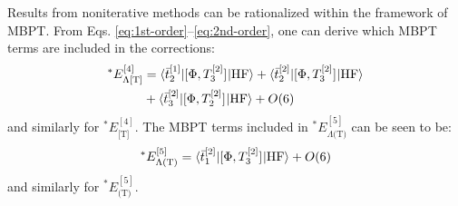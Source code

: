 Results from noniterative methods can be rationalized within the
framework of \acrshort*{MBPT}.\autocite{Stanton1997-lx, Koch1997-nm,
Eriksen2014-gy, Eriksen2015-il, Kristensen2016-od}
From Eqs. \eqref{eq:1st-order}--\eqref{eq:2nd-order}, one can derive
which \acrshort*{MBPT} terms are included in the corrections:
\begin{equation}
  \begin{aligned}
  {}^* E^{[4]}_{\Lambda\text{[T]}}
  &=
    \braket{\bar{t}_{2}^{[1]}| [ \Phi, T_3^{[2]} ]^{} | \mathrm{HF}}
  + \braket{\bar{t}_{2}^{[2]} | [ \Phi, T_3^{[2]} ]^{} | \mathrm{HF}} \\
  &+ \braket{\bar{t}_{3}^{[2]} | [ \Phi, T_2^{[2]} ]^{} | \mathrm{HF}}
  + O(6)
  \end{aligned}
\end{equation}
and similarly for ${}^* E^{[4]}_{\text{[T]}}$.
The \acrshort*{MBPT} terms included in ${}^*
E^{[5]}_{\Lambda\text{(T)}}$ can be seen to be:
\begin{equation}
  {}^* E^{[5]}_{\Lambda\text{(T)}}
  =
  \braket{\bar{t}_{1}^{[2]} | [ \Phi, T_3^{[2]} ]^{} | \mathrm{HF}}
  + O(6)
\end{equation}
and similarly for ${}^* E^{[5]}_{\text{(T)}}$.
